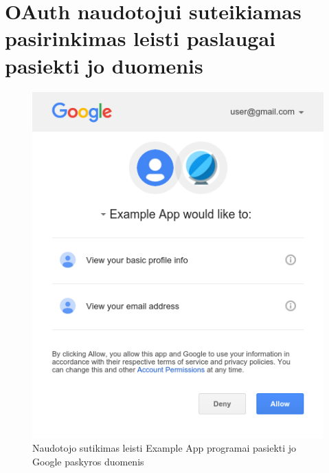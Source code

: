 \section{OAuth naudotojui suteikiamas pasirinkimas leisti paslaugai pasiekti jo duomenis}
\label{appendix:SSOUserConsent}

\begin{figure}[H]
    \centering
    \includegraphics[scale=0.7]{img/OAuthUserConsent}
    \caption{Naudotojo sutikimas leisti Example App programai pasiekti jo Google paskyros duomenis}
    \label{fig:SSOUserConsent}
\end{figure}